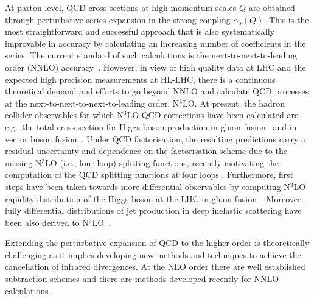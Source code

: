 At  parton level, QCD cross sections at high momentum scales $Q$  are obtained through perturbative series expansion in the strong coupling $\alpha_s(Q)$.
This is the most  straightforward and successful approach that is also systematically improvable in accuracy  by calculating an increasing number of coefficients in the series. The current standard of such calculations is the next-to-next-to-leading order (NNLO) accuracy~\cite{Boughezal:2015dva,Ridder:2015dxa,Czakon:2015owf,Czakon:2016dgf,Currie:2013dwa,Currie:2016bfm}.  However, in view  of high quality data at  LHC  and the expected high precision  measurements at HL-LHC,    there is a continuous theoretical  demand and efforts to go beyond NNLO and calculate QCD processes at the next-to-next-to-next-to-leading order, N$^3$LO.
   At present, the   hadron collider observables for which N$^3$LO QCD corrections have been calculated are e.g.\ the total cross section for Higgs boson production in gluon fusion~\cite{Anastasiou:2015ema,Mistlberger:2018etf} and in vector boson fusion~\cite{Dreyer:2016oyx}.
   Under QCD factorisation, the resulting predictions carry a residual uncertainty and dependence on the factorisation scheme due to the missing N$^3$LO (i.e., four-loop) splitting functions, recently motivating the computation of the QCD splitting functions at four loops \cite{Baikov:2006ai,Velizhanin:2011es,Baikov:2015tea,Davies:2016jie,Moch:2017uml}.  Furthermore, first steps have been taken towards more differential observables by computing  N$^3$LO  rapidity distribution of the Higgs boson at the LHC   in  gluon  fusion~\cite{Dulat:2017prg,Dulat:2018bfe,Cieri:2018oms}.  Moreover, fully differential distributions of jet production in deep inelastic scattering have been also derived    to N$^3$LO~\cite{Currie:2018fgr}.

Extending the perturbative  expansion  of QCD    to  the higher order is theoretically challenging as it    implies developing new methods and techniques to achieve the cancellation of infrared   divergences. At the NLO order there  are well established subtraction schemes and there are methods developed recently for NNLO calculations
\cite{Catani:2007vq,Bozzi:2005wk,Bonciani:2015sha,Boughezal:2015eha,Gaunt:2015pea,Czakon:2011ve,Boughezal:2011jf,Cacciari:2015jma,Ger}. %




